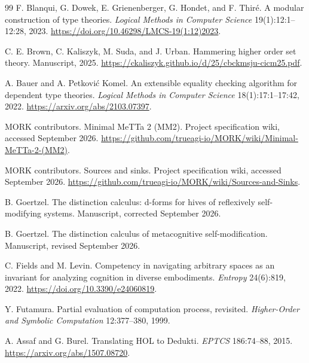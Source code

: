 \documentclass[11pt]{article}
\theoremstyle{definition}
\theoremstyle{remark}
\begin{document}
\begin{thebibliography}{99}
F. Blanqui, G. Dowek, E. Grienenberger, G. Hondet, and F. Thir\'e.
\newblock A modular construction of type theories.
\newblock \emph{Logical Methods in Computer Science} 19(1):12:1--12:28, 2023.
\newblock \url{https://doi.org/10.46298/LMCS-19(1:12)2023}.

C. E. Brown, C. Kaliszyk, M. Suda, and J. Urban.
\newblock Hammering higher order set theory.
\newblock Manuscript, 2025.
\newblock \url{https://ckaliszyk.github.io/d/25/cbckmsju-cicm25.pdf}.

A. Bauer and A. Petkovi\'c Komel.
\newblock An extensible equality checking algorithm for dependent type theories.
\newblock \emph{Logical Methods in Computer Science} 18(1):17:1--17:42, 2022.
\newblock \url{https://arxiv.org/abs/2103.07397}.

MORK contributors.
\newblock Minimal MeTTa 2 (MM2).
\newblock Project specification wiki, accessed September 2026.
\newblock \url{https://github.com/trueagi-io/MORK/wiki/Minimal-MeTTa-2-(MM2)}.

MORK contributors.
\newblock Sources and sinks.
\newblock Project specification wiki, accessed September 2026.
\newblock \url{https://github.com/trueagi-io/MORK/wiki/Sources-and-Sinks}.

B. Goertzel.
\newblock The distinction calculus: d-forms for hives of reflexively
  self-modifying systems.
\newblock Manuscript, corrected September 2026.

B. Goertzel.
\newblock The distinction calculus of metacognitive self-modification.
\newblock Manuscript, revised September 2026.

C. Fields and M. Levin.
\newblock Competency in navigating arbitrary spaces as an invariant for
  analyzing cognition in diverse embodiments.
\newblock \emph{Entropy} 24(6):819, 2022.
\newblock \url{https://doi.org/10.3390/e24060819}.

Y. Futamura.
\newblock Partial evaluation of computation process, revisited.
\newblock \emph{Higher-Order and Symbolic Computation} 12:377--380, 1999.

A. Assaf and G. Burel.
\newblock Translating HOL to Dedukti.
\newblock \emph{EPTCS} 186:74--88, 2015.
\newblock \url{https://arxiv.org/abs/1507.08720}.


\end{thebibliography}
\end{document}
